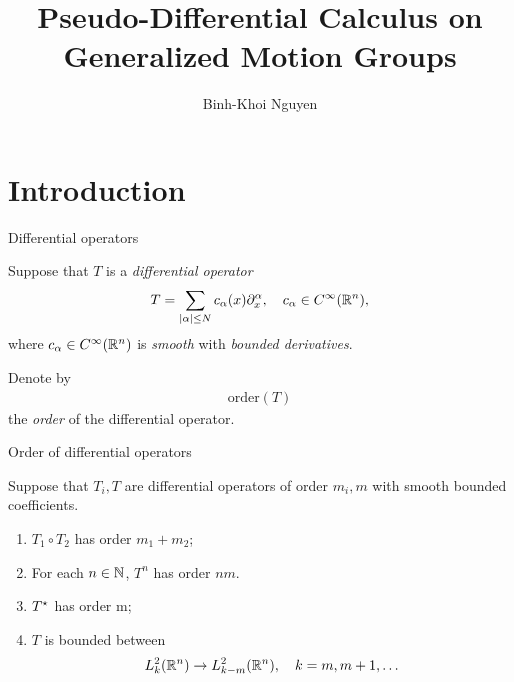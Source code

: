 \documentclass[handout]{beamer}
\title{Pseudo-Differential Calculus on Generalized Motion Groups}
\author{Binh-Khoi Nguyen}
\begin{document}
\maketitle

\section{Introduction}

\renewcommand \Group {\R^n}

\begin{frame}
    {Differential operators}

    Suppose that $T$ is a \emph{differential operator}
    \begin{align*}
        T =
        \sum_{\abs \alpha \leq N}
        c_\alpha(x)
        \iD {x^\alpha},
        \quad
        c_\alpha \in \SmoothFunctions {\R^n},
    \end{align*}
    where $c_\alpha \in {C^\infty(\mathbb{R}^n)}$ is \emph{smooth} with \emph{bounded derivatives}.

    \pause

    Denote by
    \begin{align*}
        \mathrm{order}(T)
    \end{align*}
    the \emph{order} of the differential operator.
\end{frame}

\begin{frame}
    {Order of differential operators}

    Suppose that $T_i, T$ are differential operators
    of order $m_i, m$
    with smooth bounded coefficients.

    \begin{enumerate}
        \item $T_1 \circ T_2$ has order $m_1 + m_2$;
            \pause
        \item For each $n \in \mathbb{N}$, $T^n$ has order $n m$.
            \pause
        \item ${T}^\star$ has order m;
            \pause
        \item $T$ is bounded between
            \begin{align*}
                \Sobolev k \to \Sobolev {k - m},
                \quad k = m, m + 1, \dots
            \end{align*}
    \end{enumerate}
\end{frame}
\end{document}
